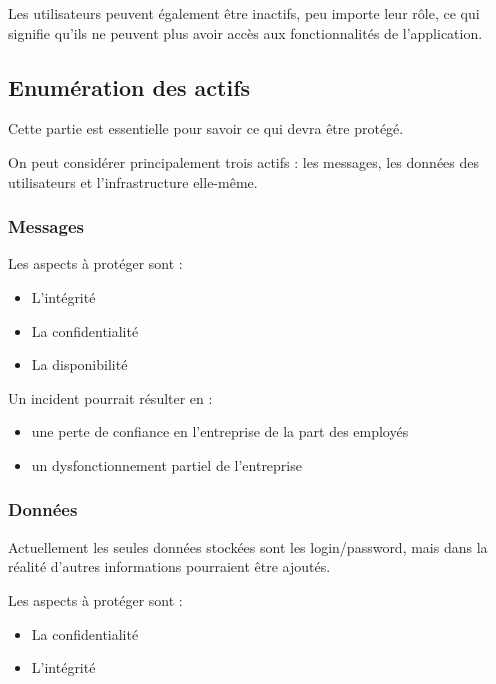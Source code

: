 \documentclass{article}
\begin{document}
Les utilisateurs peuvent également être inactifs, peu importe leur rôle,
ce qui signifie qu'ils ne peuvent plus avoir accès aux fonctionnalités
de l'application.

\subsection{Enumération des actifs}

Cette partie est essentielle pour savoir ce qui devra être protégé.

On peut considérer principalement trois actifs : les messages, les
données des utilisateurs et l'infrastructure elle-même.

\subsubsection{Messages}

Les aspects à protéger sont :

\begin{itemize}

\item
  L'intégrité
\item
  La confidentialité
\item
  La disponibilité
\end{itemize}

Un incident pourrait résulter en :

\begin{itemize}

\item
  une perte de confiance en l'entreprise de la part des employés
\item
  un dysfonctionnement partiel de l'entreprise
\end{itemize}

\subsubsection{Données}

Actuellement les seules données stockées sont les login/password, mais
dans la réalité d'autres informations pourraient être ajoutés.

Les aspects à protéger sont :

\begin{itemize}

\item
  La confidentialité
\item
  L'intégrité
\end{itemize}
\end{document}
